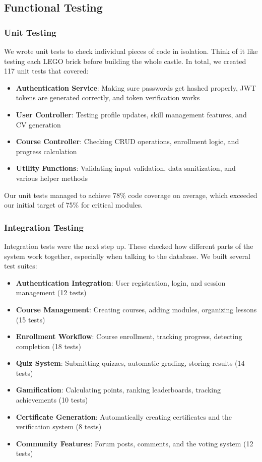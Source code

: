 \documentclass[final,3p,times,twocolumn]{elsarticle}
\begin{document}
\subsection{Functional Testing}

\subsubsection{Unit Testing}

We wrote unit tests to check individual pieces of code in isolation. Think of it like testing each LEGO brick before building the whole castle. In total, we created 117 unit tests that covered:

\begin{itemize}
    \item \textbf{Authentication Service}: Making sure passwords get hashed properly, JWT tokens are generated correctly, and token verification works
    \item \textbf{User Controller}: Testing profile updates, skill management features, and CV generation
    \item \textbf{Course Controller}: Checking CRUD operations, enrollment logic, and progress calculation
    \item \textbf{Utility Functions}: Validating input validation, data sanitization, and various helper methods
\end{itemize}

Our unit tests managed to achieve 78\% code coverage on average, which exceeded our initial target of 75\% for critical modules.

\subsubsection{Integration Testing}

Integration tests were the next step up. These checked how different parts of the system work together, especially when talking to the database. We built several test suites:

\begin{itemize}
    \item \textbf{Authentication Integration}: User registration, login, and session management (12 tests)
    \item \textbf{Course Management}: Creating courses, adding modules, organizing lessons (15 tests)
    \item \textbf{Enrollment Workflow}: Course enrollment, tracking progress, detecting completion (18 tests)
    \item \textbf{Quiz System}: Submitting quizzes, automatic grading, storing results (14 tests)
    \item \textbf{Gamification}: Calculating points, ranking leaderboards, tracking achievements (10 tests)
    \item \textbf{Certificate Generation}: Automatically creating certificates and the verification system (8 tests)
    \item \textbf{Community Features}: Forum posts, comments, and the voting system (12 tests)
\end{itemize}
\end{document}
